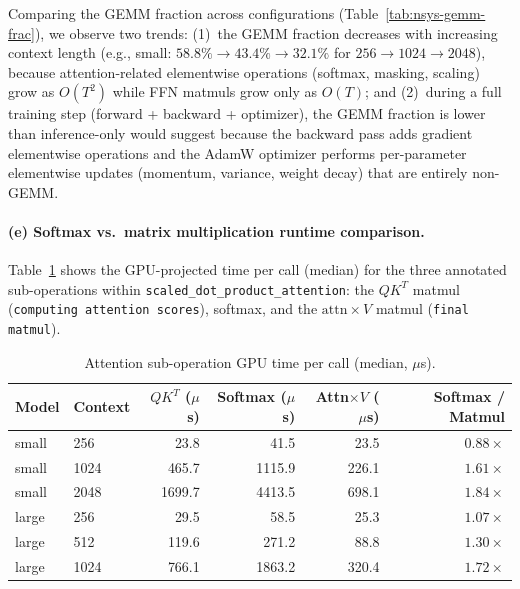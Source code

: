 \documentclass[11pt]{article}
\begin{document}
Comparing the GEMM fraction across configurations
(Table~\ref{tab:nsys-gemm-frac}), we observe two trends:
(1)~the GEMM fraction decreases with increasing context length
(e.g., small: $58.8\% \to 43.4\% \to 32.1\%$ for
$256 \to 1024 \to 2048$), because attention-related elementwise
operations (softmax, masking, scaling) grow as $O(T^2)$ while
FFN matmuls grow only as $O(T)$; and
(2)~during a full training step (forward + backward + optimizer),
the GEMM fraction is lower than inference-only would suggest because
the backward pass adds gradient elementwise operations and the
AdamW optimizer performs per-parameter elementwise updates
(momentum, variance, weight decay) that are entirely non-GEMM.

\paragraph{(e) Softmax vs.\ matrix multiplication runtime comparison.}

Table~\ref{tab:nsys-attn-breakdown} shows the GPU-projected time per call
(median) for the three annotated sub-operations within
\texttt{scaled\_dot\_product\_attention}: the $QK^T$ matmul
(\texttt{computing attention scores}), softmax, and the
$\text{attn} \times V$ matmul (\texttt{final matmul}).

\begin{table}[H]
\centering
\caption{Attention sub-operation GPU time per call (median, $\mu$s).}
\label{tab:nsys-attn-breakdown}
\begin{tabular}{llrrrr}
  \toprule
  Model & Context & $QK^T$ ($\mu$s) & Softmax ($\mu$s) & Attn$\times V$ ($\mu$s) & Softmax / Matmul \\
  \midrule
  small & 256  &    23.8 &    41.5 &   23.5 & $0.88\times$ \\
  small & 1024 &   465.7 &  1115.9 &  226.1 & $1.61\times$ \\
  small & 2048 &  1699.7 &  4413.5 &  698.1 & $1.84\times$ \\
  \midrule
  large & 256  &    29.5 &    58.5 &   25.3 & $1.07\times$ \\
  large & 512  &   119.6 &   271.2 &   88.8 & $1.30\times$ \\
  large & 1024 &   766.1 &  1863.2 &  320.4 & $1.72\times$ \\
  \bottomrule
\end{tabular}
\end{table}
\end{document}
